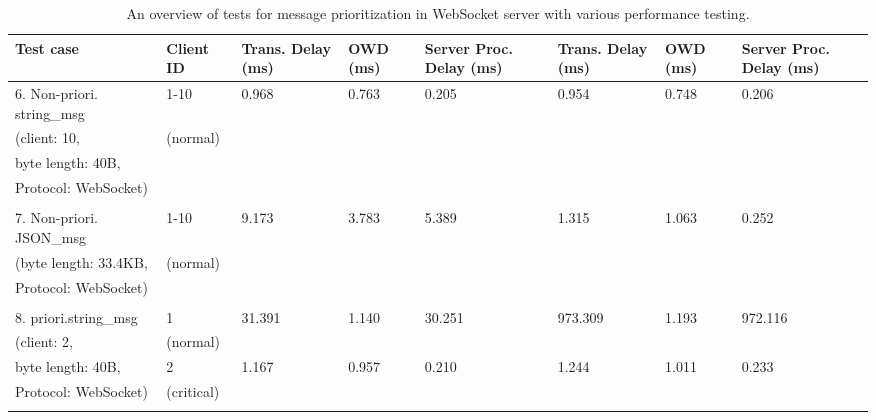     \begin{table}[htbp]
        \footnotesize
    \centering
    \caption{An overview of tests for message prioritization in WebSocket server with various performance testing.}
    \label{tab: TestsPriority}

    \begin{tabular}{m{} m{} m{} m{} m{} m{} m{} m{}}
        \textbf{Test case}                     & \textbf{Client ID}  & \textbf{Trans. Delay (ms)} & \textbf{OWD (ms)}    & \textbf{Server Proc. Delay (ms)} & \textbf{Trans. Delay (ms)} & \textbf{OWD (ms)}    & \textbf{Server Proc. Delay (ms)} \\ \hline
        6. Non-priori. string\_msg    & 1-10       & 0.968   & 0.763  & 0.205   & 0.954   & 0.748  & 0.206   \\
        (client: 10,                  & (normal)   &         &        &         &         &        &         \\
        byte length: 40B,             &            &         &        &         &         &        &         \\
        Protocol: WebSocket)          &            &         &        &         &         &        &         \\
        & & & & & & &\\
        7. Non-priori. JSON\_msg      & 1-10       & 9.173   & 3.783  & 5.389   & 1.315   & 1.063  & 0.252   \\
        (byte length: 33.4KB,         & (normal)   &         &        &         &         &        &         \\
        Protocol: WebSocket)          &            &         &        &         &         &        &         \\
        & & & & & & &\\
        8. priori.string\_msg         & 1          & 31.391  & 1.140  & 30.251  & 973.309 & 1.193  & 972.116 \\
        (client: 2,                   & (normal)   &         &        &         &         &        &         \\
        byte length: 40B,             & 2          & 1.167   & 0.957  & 0.210   & 1.244   & 1.011  & 0.233   \\
        Protocol: WebSocket)          & (critical) &         &        &         &         &        &         \\
        & & & & & & &\\

\end{tabular}
\end{table}
